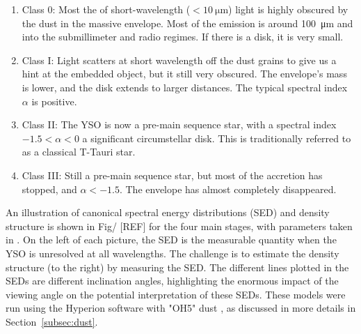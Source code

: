 \begin{enumerate}
\item Class 0: Most the of short-wavelength ($<\SI{10}{\micro\meter}$) light is highly obscured by the dust in the massive envelope. Most of the emission is around \SI{100}{\micro\meter} and into the submillimeter and radio regimes. If there is a disk, it is very small.
\item Class I: Light scatters at short wavelength off the dust grains to give us a hint at the embedded object, but it still very obscured. The envelope's mass is lower, and the disk extends to larger distances. The typical spectral index $\alpha$ is positive.
\item Class II: The YSO is now a pre-main sequence star, with a spectral index $-1.5 < \alpha < 0$ a significant circumstellar disk. This is traditionally referred to as a classical T-Tauri star.
\item Class III: Still a pre-main sequence star, but most of the accretion has stopped, and $\alpha < -1.5$. The envelope has almost completely disappeared.
\end{enumerate}

An illustration of canonical spectral energy distributions (SED) and density structure is shown in Fig/ [REF] for the four main stages, with parameters taken in \cite{Whitney:2003kc}. On the left of each picture, the SED is the measurable quantity when the YSO is unresolved at all wavelengths. The challenge is to estimate the density structure (to the right) by measuring the SED. The different lines plotted in the SEDs are different inclination angles, highlighting the enormous impact of the viewing angle on the potential interpretation of these SEDs. These models were run using the Hyperion software \citep{Robitaille:2011fc} with "OH5" dust \citep{Ossenkopf:1994tq}, as discussed in more details in Section~\ref{subsec:dust}.


